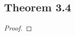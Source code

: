 \documentclass[../../main.tex]{subfiles}
\begin{document}
\subsection{Theorem 3.4}
\begin{wts}

\end{wts}
\begin{proof}

\end{proof}
\end{document}
